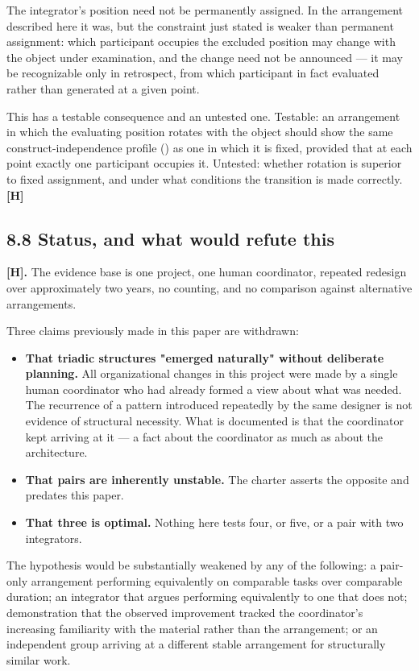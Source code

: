 The integrator's position need not be permanently assigned. In the arrangement described here it was, but the constraint just stated is weaker than permanent assignment: which participant occupies the excluded position may change with the object under examination, and the change need not be announced — it may be recognizable only in retrospect, from which participant in fact evaluated rather than generated at a given point.

This has a testable consequence and an untested one. Testable: an arrangement in which the evaluating position rotates with the object should show the same construct-independence profile () as one in which it is fixed, provided that at each point exactly one participant occupies it. Untested: whether rotation is superior to fixed assignment, and under what conditions the transition is made correctly. \textbf{[H]}


\subsection*{8.8 Status, and what would refute this}
\label{sec:en:8.8}

\textbf{[H].} The evidence base is one project, one human coordinator, repeated redesign over approximately two years, no counting, and no comparison against alternative arrangements.

Three claims previously made in this paper are withdrawn:

\begin{itemize}
  \item \textbf{That triadic structures "emerged naturally" without deliberate planning.} All organizational changes in this project were made by a single human coordinator who had already formed a view about what was needed. The recurrence of a pattern introduced repeatedly by the same designer is not evidence of structural necessity. What is documented is that the coordinator kept arriving at it — a fact about the coordinator as much as about the architecture.
  \item \textbf{That pairs are inherently unstable.} The charter asserts the opposite and predates this paper.
  \item \textbf{That three is optimal.} Nothing here tests four, or five, or a pair with two integrators.
\end{itemize}
The hypothesis would be substantially weakened by any of the following: a pair-only arrangement performing equivalently on comparable tasks over comparable duration; an integrator that argues performing equivalently to one that does not; demonstration that the observed improvement tracked the coordinator's increasing familiarity with the material rather than the arrangement; or an independent group arriving at a different stable arrangement for structurally similar work.


